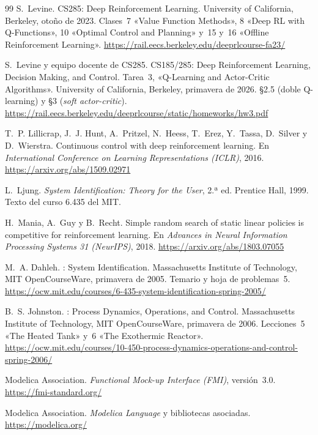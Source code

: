 \begin{thebibliography}{99}
S.~Levine.
\newblock CS285: Deep Reinforcement Learning.
\newblock University of California, Berkeley, otoño de 2023. Clases~7 «Value Function Methods», 8 «Deep RL with Q-Functions», 10 «Optimal Control and Planning» y~15 y~16 «Offline Reinforcement Learning».
\newblock \url{https://rail.eecs.berkeley.edu/deeprlcourse-fa23/}

S.~Levine y equipo docente de CS285.
\newblock CS185/285: Deep Reinforcement Learning, Decision Making, and Control. Tarea~3, «Q-Learning and Actor-Critic Algorithms».
\newblock University of California, Berkeley, primavera de 2026. §2.5 (doble Q-learning) y §3 (\emph{soft actor-critic}).
\newblock \url{https://rail.eecs.berkeley.edu/deeprlcourse/static/homeworks/hw3.pdf}

T.~P. Lillicrap, J.~J. Hunt, A.~Pritzel, N.~Heess, T.~Erez, Y.~Tassa, D.~Silver y D.~Wierstra.
\newblock Continuous control with deep reinforcement learning.
\newblock En \emph{International Conference on Learning Representations (ICLR)}, 2016.
\newblock \url{https://arxiv.org/abs/1509.02971}

L.~Ljung.
\newblock \emph{System Identification: Theory for the User}, 2.ª ed.
\newblock Prentice Hall, 1999. Texto del curso 6.435 del MIT.

H.~Mania, A.~Guy y B.~Recht.
\newblock Simple random search of static linear policies is competitive for reinforcement learning.
\newblock En \emph{Advances in Neural Information Processing Systems 31 (NeurIPS)}, 2018.
\newblock \url{https://arxiv.org/abs/1803.07055}

M.~A. Dahleh.
: System Identification.
\newblock Massachusetts Institute of Technology, MIT OpenCourseWare, primavera de 2005. Temario y hoja de problemas~5.
\newblock \url{https://ocw.mit.edu/courses/6-435-system-identification-spring-2005/}

B.~S. Johnston.
: Process Dynamics, Operations, and Control.
\newblock Massachusetts Institute of Technology, MIT OpenCourseWare, primavera de 2006. Lecciones~5 «The Heated Tank» y~6 «The Exothermic Reactor».
\newblock \url{https://ocw.mit.edu/courses/10-450-process-dynamics-operations-and-control-spring-2006/}

Modelica Association.
\newblock \emph{Functional Mock-up Interface (FMI)}, versión~3.0.
\newblock \url{https://fmi-standard.org/}

Modelica Association.
\newblock \emph{Modelica Language} y bibliotecas asociadas.
\newblock \url{https://modelica.org/}


\end{thebibliography}
